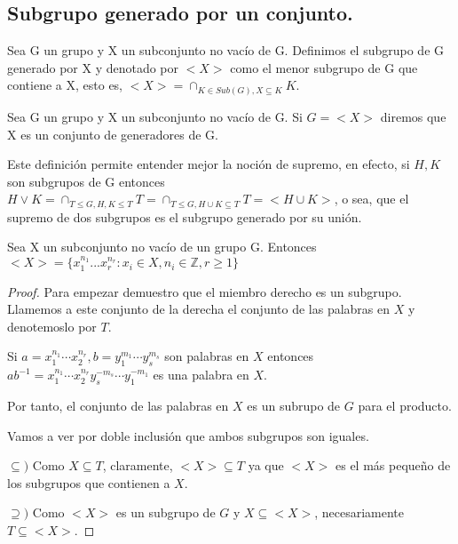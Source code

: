 \subsection{Subgrupo generado por un conjunto.}

\begin{ndef}
Sea G un grupo y X un subconjunto no vacío de G. Definimos el subgrupo de G generado por X y denotado por $<X>$ como el menor subgrupo de G que contiene a X, esto es, 
$<X> = \cap_{K \in Sub(G),X \subseteq K} K$.
\end{ndef}

\begin{ndef}
Sea G un grupo y X un subconjunto no vacío de G. Si $G = <X>$ diremos que X es un conjunto de generadores de G.
\end{ndef}

Este definición permite entender mejor la noción de supremo, en efecto, si $H,K$ son subgrupos de G entonces $H \lor K = \cap_{T \le G, H,K \le T} T = \cap_{T \le G, H \cup K \subseteq T} T = <H \cup K>$, o sea, que el supremo de dos subgrupos es el subgrupo generado por su unión.

\begin{nprop}
Sea X un subconjunto no vacío de un grupo G. Entonces $<X> = \{x_1^{n_1}...x_r^{n_r}:x_i \in X,n_i \in \mathbb{Z},r \ge 1\}$
\end{nprop}
\begin{proof}
Para empezar demuestro que el miembro derecho es un subgrupo. Llamemos a este conjunto de la derecha el conjunto de las palabras en $X$ y denotemoslo por $T$. 

Si $a = x_1^{n_1} \cdots x_2^{n_r}, b = y_1^{m_1} \cdots y_s^{m_s}$ son palabras en $X$ entonces $ab^{-1} =  x_1^{n_1} \cdots x_2^{n_r}y_s^{-m_s} \cdots y_1^{-m_1}$ es una palabra en $X$. 

Por tanto, el conjunto de las palabras en $X$ es un subrupo de $G$ para el producto. 

Vamos a ver por doble inclusión que ambos subgrupos son iguales. 

$\subseteq)$ Como $X \subseteq T$, claramente, $<X> \subseteq T$ ya que $<X>$ es el más pequeño de los subgrupos que contienen a $X$. 

$\supseteq)$ Como $<X>$ es un subgrupo de $G$ y $X \subseteq <X>$, necesariamente $T \subseteq <X>$. 
\end{proof}

